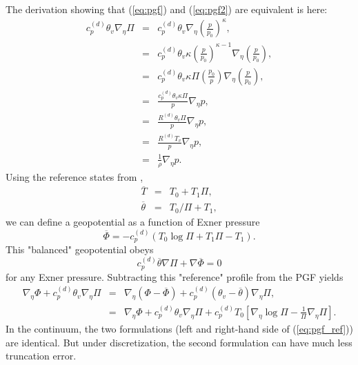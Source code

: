 \documentclass[draft]{agujournal2019}
\begin{document}
The derivation showing that (\ref{eq:pgf}) and (\ref{eq:pgf2}) are equivalent is {\color{blue}{given}} here:
\begin{eqnarray*}
c_p^{(d)}\theta_v\nabla_{\eta }\Pi &=& c_p^{(d)}\theta_v\nabla_{\eta }\left( \frac{p}{p_0}\right)^{\kappa},\\
&=& c_p^{(d)}\theta_v\kappa\left( \frac{p}{p_0}\right)^{\kappa-1} \nabla_{\eta }\left( \frac{p}{p_0}\right),\\
&=& c_p^{(d)}\theta_v\kappa\Pi\left( \frac{p_0}{p}\right) \nabla_{\eta }\left(\frac{p}{p_0}\right),\\
&=& \frac{c_p^{(d)}\theta_v\kappa\Pi}{p} \nabla_{\eta }p,\\
&=& \frac{R^{(d)}\theta_v\Pi}{p} \nabla_{\eta }p,\\
&=& \frac{R^{(d)}T_v}{p} \nabla_{\eta }p,\\
&=& \frac{1}{\rho} \nabla_{\eta }p.
\end{eqnarray*}
{\color{blue}{where virtual potential temperature is $T_v/\Pi$.}} Using the reference states from \cite{SJ1991QJRMS},
\begin{eqnarray}
  \overline{T}&=&T_0+T_1 \Pi,\\
  \overline{\theta}&=&{T_0}/\Pi+T_1,
\end{eqnarray}
we can define a geopotential as a function of Exner pressure
\begin{equation}
    \overline{\Phi} = -c_p^{(d)}\left( T_0\log \Pi+T_1\Pi-T_1\right). 
\end{equation}
This "balanced" geopotential obeys
\begin{equation}
    c_p^{(d)}\overline{\theta}\nabla \Pi+\nabla \overline{\Phi}=0 
\end{equation}
for any Exner pressure. Subtracting this "reference" profile from the PGF yields
\begin{eqnarray}
    \nabla_{\eta }\Phi+c_p^{(d)}\theta_v\nabla_{\eta }\Pi&=& \nabla_{\eta }\left(\Phi-\overline{\Phi}\right)+c_p^{(d)}\left(\theta_v-\overline{\theta}\right)\nabla_{\eta }\Pi,\nonumber \\
    &=& \nabla_{\eta }\Phi+c_p^{(d)}\theta_v\nabla_{\eta }\Pi+c_p^{(d)}T_0\left[ \nabla_\eta \log \Pi -\frac{1}{\Pi}\nabla_\eta \Pi\right].\label{eq:pgf_ref}
\end{eqnarray}
In the continuum, the two formulations (left and right-hand side of (\ref{eq:pgf_ref})) are identical. But under discretization, the second formulation can have much less truncation error. 
\end{document}

